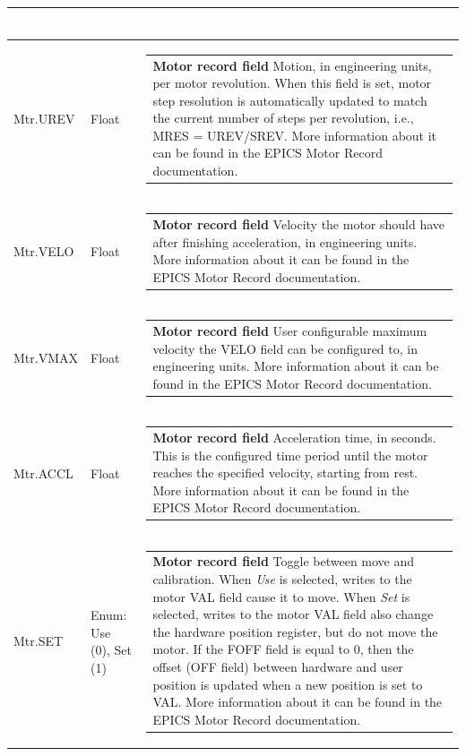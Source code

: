 \documentclass[openany]{article}
\begin{document}
\begin{longtable}{| m{4.5cm} m{2.5cm}  m{8.5cm} |}
\begin{tabular}{@{}m{6cm}@{}}
            \end{tabular} \hypertarget{pv:mtr-urev}{}\\ \hline
        Mtr.UREV & Float & \begin{tabular}{@{}m{6cm}@{}}
                \textbf{\color{ForestGreen} Motor record field} Motion, in engineering units, per motor revolution. When this field is set, motor step resolution is automatically updated to match the current number of steps per revolution, i.e., MRES = UREV/SREV. More information about it can be found in the EPICS Motor Record documentation.
            \end{tabular} \hypertarget{pv:mtr-velo}{}\\ \hline
        Mtr.VELO & Float & \begin{tabular}{@{}m{6cm}@{}}
                \textbf{\color{ForestGreen} Motor record field} Velocity the motor should have after finishing acceleration, in engineering units. More information about it can be found in the EPICS Motor Record documentation.
            \end{tabular} \hypertarget{pv:mtr-vmax}{}\\ \hline
        Mtr.VMAX & Float & \begin{tabular}{@{}m{6cm}@{}}
                \textbf{\color{ForestGreen} Motor record field} User configurable maximum velocity the VELO field can be configured to, in engineering units. More information about it can be found in the EPICS Motor Record documentation.
            \end{tabular} \hypertarget{pv:mtr-accl}{}\\ \hline
        Mtr.ACCL & Float & \begin{tabular}{@{}m{6cm}@{}}
                \textbf{\color{ForestGreen} Motor record field} Acceleration time, in seconds. This is the configured time period until the motor reaches the specified velocity, starting from rest. More information about it can be found in the EPICS Motor Record documentation.
            \end{tabular} \hypertarget{pv:mtr-set}{}\\ \hline
        Mtr.SET & Enum: Use (0), Set (1) & \begin{tabular}{@{}m{6cm}@{}}
                \textbf{\color{ForestGreen} Motor record field} Toggle between move and calibration. When \emph{Use} is selected, writes to the motor VAL field cause it to move. When \emph{Set} is selected, writes to the motor VAL field also change the hardware position register, but do not move the motor. If the FOFF field is equal to 0, then the offset (OFF field) between hardware and user position is updated when a new position is set to VAL. More information about it can be found in the EPICS Motor Record documentation.

\end{tabular}
\end{longtable}
\end{document}

